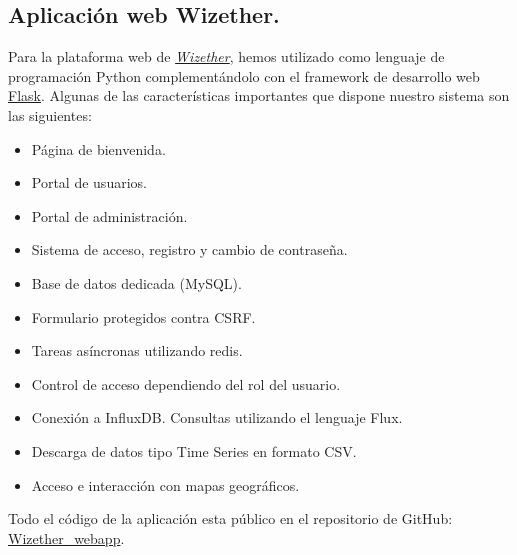 \documentclass[12pt]{article}
\begin{document}
\subsection{Aplicación web Wizether.}
\noindent Para la plataforma web de \href{https://wizether.ranii.pro/}{\textit{Wizether}}, hemos utilizado como lenguaje de programación Python complementándolo con el framework de desarrollo web \href{https://flask.palletsprojects.com/en/1.1.x/}{Flask}. Algunas de las características importantes que dispone nuestro sistema son las siguientes:
\begin{itemize}
	\item Página de bienvenida.
	\item Portal de usuarios.
	\item Portal de administración.
	\item Sistema de acceso, registro y cambio de contraseña.
	\item Base de datos dedicada (MySQL).
	\item Formulario protegidos contra CSRF.
	\item Tareas asíncronas utilizando redis.
	\item Control de acceso dependiendo del rol del usuario.
	\item Conexión a InfluxDB. Consultas utilizando el lenguaje Flux.
	\item Descarga de datos tipo Time Series en formato CSV.
	\item Acceso e interacción con mapas geográficos.
\end{itemize}

\noindent Todo el código de la aplicación esta público en el repositorio de GitHub: \href{https://github.com/Raniita/wizether_webapp}{Wizether\_webapp}.\\
\end{document}
